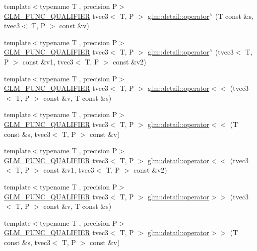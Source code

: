 \begin{DoxyCompactItemize}
{\footnotesize template$<$typename T , precision P$>$ }\\\hyperlink{setup_8hpp_a33fdea6f91c5f834105f7415e2a64407}{G\+L\+M\+\_\+\+F\+U\+N\+C\+\_\+\+Q\+U\+A\+L\+I\+F\+I\+ER} tvec3$<$ T, P $>$ \hyperlink{namespaceglm_1_1detail_a808264809be997916c2d1e7b35ce8845}{glm\+::detail\+::operator$^\wedge$} (T const \&s, tvec3$<$ T, P $>$ const \&v)
\item 
{\footnotesize template$<$typename T , precision P$>$ }\\\hyperlink{setup_8hpp_a33fdea6f91c5f834105f7415e2a64407}{G\+L\+M\+\_\+\+F\+U\+N\+C\+\_\+\+Q\+U\+A\+L\+I\+F\+I\+ER} tvec3$<$ T, P $>$ \hyperlink{namespaceglm_1_1detail_a33dbad032e6146ae128e941dfb82c437}{glm\+::detail\+::operator$^\wedge$} (tvec3$<$ T, P $>$ const \&v1, tvec3$<$ T, P $>$ const \&v2)
\item 
{\footnotesize template$<$typename T , precision P$>$ }\\\hyperlink{setup_8hpp_a33fdea6f91c5f834105f7415e2a64407}{G\+L\+M\+\_\+\+F\+U\+N\+C\+\_\+\+Q\+U\+A\+L\+I\+F\+I\+ER} tvec3$<$ T, P $>$ \hyperlink{namespaceglm_1_1detail_adbd27dd5744a4706f2bee702f4960720}{glm\+::detail\+::operator$<$$<$} (tvec3$<$ T, P $>$ const \&v, T const \&s)
\item 
{\footnotesize template$<$typename T , precision P$>$ }\\\hyperlink{setup_8hpp_a33fdea6f91c5f834105f7415e2a64407}{G\+L\+M\+\_\+\+F\+U\+N\+C\+\_\+\+Q\+U\+A\+L\+I\+F\+I\+ER} tvec3$<$ T, P $>$ \hyperlink{namespaceglm_1_1detail_a13cc08f9688dc673ff641f423db2c21c}{glm\+::detail\+::operator$<$$<$} (T const \&s, tvec3$<$ T, P $>$ const \&v)
\item 
{\footnotesize template$<$typename T , precision P$>$ }\\\hyperlink{setup_8hpp_a33fdea6f91c5f834105f7415e2a64407}{G\+L\+M\+\_\+\+F\+U\+N\+C\+\_\+\+Q\+U\+A\+L\+I\+F\+I\+ER} tvec3$<$ T, P $>$ \hyperlink{namespaceglm_1_1detail_ab5d7ca4be82fb49fd437667d27c5f4fe}{glm\+::detail\+::operator$<$$<$} (tvec3$<$ T, P $>$ const \&v1, tvec3$<$ T, P $>$ const \&v2)
\item 
{\footnotesize template$<$typename T , precision P$>$ }\\\hyperlink{setup_8hpp_a33fdea6f91c5f834105f7415e2a64407}{G\+L\+M\+\_\+\+F\+U\+N\+C\+\_\+\+Q\+U\+A\+L\+I\+F\+I\+ER} tvec3$<$ T, P $>$ \hyperlink{namespaceglm_1_1detail_a840967a489507278a19e66be7dddb3b2}{glm\+::detail\+::operator$>$$>$} (tvec3$<$ T, P $>$ const \&v, T const \&s)
\item 
{\footnotesize template$<$typename T , precision P$>$ }\\\hyperlink{setup_8hpp_a33fdea6f91c5f834105f7415e2a64407}{G\+L\+M\+\_\+\+F\+U\+N\+C\+\_\+\+Q\+U\+A\+L\+I\+F\+I\+ER} tvec3$<$ T, P $>$ \hyperlink{namespaceglm_1_1detail_a9caa9bd722358d7a2f72b8bf245e7835}{glm\+::detail\+::operator$>$$>$} (T const \&s, tvec3$<$ T, P $>$ const \&v)

\end{DoxyCompactItemize}
